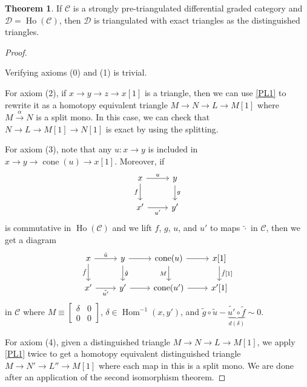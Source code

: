 \documentclass[10pt,letterpaper,cm]{nupset}
\theoremstyle{definition}
\theoremstyle{theorem}
\newtheorem{theorem}[definition]{Theorem}
\theoremstyle{remark}
\newcommand{\1}{\mathbf{1}}
\renewcommand{\c}{\mathscr{C}}
\renewcommand{\d}{\mathscr{D}}
\newcommand{\0}{\vec 0}
\DeclareMathOperator{\Hom}{Hom}
\DeclareMathOperator{\cone}{cone}
\DeclareMathOperator{\ho}{Ho}
\begin{document}
\begin{theorem}
If $\c$ is a strongly pre-triangulated differential graded category and $\d = \ho(\c)$, then $\d$ is triangulated with exact triangles as the distinguished triangles. 
\end{theorem}
\begin{proof} $ $

\smallskip

Verifying axioms (0) and (1) is trivial. 

\medskip

 For axiom (2), if $x \to y \to z \to x[1]$ is a triangle, then we can use \cref{PL1} to rewrite it as a homotopy equivalent triangle $M \to N \to L \to M[1]$ where $M \overset{\alpha}{\longrightarrow} N$ is a split mono. In this case, we can check that $N \to L \to M[1] \to N[1]$ is exact by using the splitting. 

\medskip

 For axiom (3), note that any $u : x \to y$ is included in $x \to y \to \cone(u) \to x[1]$. Moreover, if
\[
\begin{tikzcd}
x \arrow[r, "u"] \arrow[d, "f"'] & y \arrow[d, "g"] \\
x' \arrow[r, "u'"']              & y'              
\end{tikzcd}
\]
is commutative in $\ho(\c)$ and we lift $f$, $g$, $u$, and $u'$ to maps $\tilde{\cdot}$ in $\c$, then we get  a  diagram
\[
\begin{tikzcd}
x \arrow[r, "\tilde{u}"] \arrow[d, "\tilde{f}"'] & y \arrow[d, "\tilde{g}"] \arrow[r] & \cone(u) \arrow[d, "M"'] \arrow[r] & {x[1]} \arrow[d, "{\tilde{f}[1]}"] \\
x' \arrow[r, "\tilde{u'}"']                      & y' \arrow[r]                       & \cone(u') \arrow[r]                & {x'[1]}                           
\end{tikzcd}
\]
in $\c$ where $M \equiv \begin{bmatrix} \delta & 0 \\ 0 & 0 \end{bmatrix}$, $\delta \in \Hom^{-1}(x,y')$, and  $\tilde{g} \circ \tilde{u} - \underbrace{\tilde{u'} \circ \tilde{f}}_{d(\delta)} \sim 0.$

\medskip

 For axiom (4), given a distinguished triangle $M \to N \to L \to M[1]$, we apply \cref{PL1} twice to   get a homotopy equivalent distinguished triangle $M \to N' \to L'' \to M[1]$ where each map in this is a split mono.  We are done after an application of the second isomorphism theorem.
\end{proof}
\end{document}
